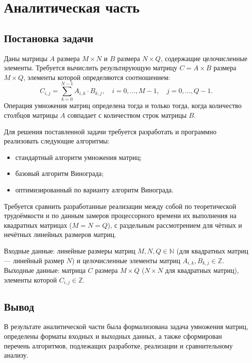 \chapter{Аналитическая часть}

\section{Постановка задачи}
Даны матрицы $A$ размера $M \times N$ и $B$ размера $N \times Q$, содержащие целочисленные элементы. Требуется вычислить результирующую матрицу $C = A \times B$ размера $M \times Q$, элементы которой определяются соотношением:
\begin{equation}
    C_{i,j} = \sum_{k=0}^{N-1} A_{i,k} \cdot B_{k,j}, \quad i = 0, \ldots, M - 1, \quad j = 0, \ldots, Q - 1.
\end{equation}
Операция умножения матриц определена тогда и только тогда, когда количество столбцов матрицы $A$ совпадает с количеством строк матрицы $B$.

Для решения поставленной задачи требуется разработать и программно реализовать следующие алгоритмы:
\begin{itemize}
    \item стандартный алгоритм умножения матриц;
    \item базовый алгоритм Винограда;
    \item оптимизированный по варианту алгоритм Винограда.
\end{itemize}

Требуется сравнить разработанные реализации между собой по теоретической трудоёмкости и по данным замеров процессорного времени их выполнения на квадратных матрицах ($M = N = Q$), с раздельным рассмотрением для чётных и нечётных линейных размеров матриц.

Входные данные: линейные размеры матриц $M, N, Q \in \mathbb{N}$ (для квадратных матриц --- линейный размер $N$) и целочисленные элементы матриц $A_{i,k}, B_{k,j} \in \mathbb{Z}$. Выходные данные: матрица $C$ размера $M \times Q$ ($N \times N$ для квадратных матриц), элементы которой $C_{i,j} \in \mathbb{Z}$.

\section{Вывод}
В результате аналитической части была формализована задача умножения матриц, определены форматы входных и выходных данных, а также сформирован перечень алгоритмов, подлежащих разработке, реализации и сравнительному анализу.